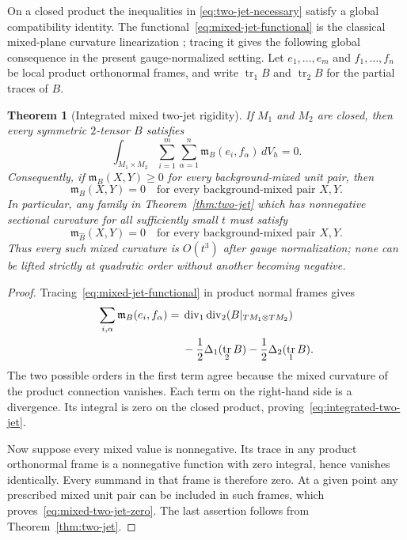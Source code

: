 \documentclass[11pt]{amsart}
\newtheorem{theorem}{Theorem}[section]
\theoremstyle{definition}
\theoremstyle{remark}
\DeclareMathOperator{\tr}{tr}
\begin{document}
On a closed product the inequalities in
\eqref{eq:two-jet-necessary} satisfy a global compatibility identity.
The functional~\eqref{eq:mixed-jet-functional} is the classical
mixed-plane curvature linearization
\cite{BourguignonDeschampsSentenac1973}; tracing it gives the following
global consequence in the present gauge-normalized setting.
Let $e_1,\ldots,e_m$ and $f_1,\ldots,f_n$ be local product
orthonormal frames, and write $\tr_1B$ and $\tr_2B$ for the partial
traces of $B$.

\begin{theorem}[Integrated mixed two-jet rigidity]
\label{thm:integrated-two-jet}
If $M_1$ and $M_2$ are closed, then every symmetric $2$-tensor $B$
satisfies
\begin{equation}\label{eq:integrated-two-jet}
 \int_{M_1\times M_2}
 \sum_{i=1}^m\sum_{\alpha=1}^n
 \mathfrak m_B(e_i,f_\alpha)\,dV_h=0.
\end{equation}
Consequently, if
$\mathfrak m_B(X,Y)\geq0$ for every background-mixed unit pair, then
\begin{equation}\label{eq:mixed-two-jet-zero}
 \mathfrak m_B(X,Y)=0
 \quad\text{for every background-mixed pair }X,Y.
\end{equation}
In particular, any family in Theorem~\ref{thm:two-jet} which has
nonnegative sectional curvature for all sufficiently small $t$ must
satisfy
\begin{equation}\label{eq:normalized-two-jet-zero}
 \mathfrak m_{\widehat B}(X,Y)=0
 \quad\text{for every background-mixed pair }X,Y.
\end{equation}
Thus every such mixed curvature is $O(t^3)$ after gauge
normalization; none can be lifted strictly at quadratic order without
another becoming negative.
\end{theorem}

\begin{proof}
Tracing~\eqref{eq:mixed-jet-functional} in product normal frames gives
\begin{align}
 \sum_{i,\alpha}\mathfrak m_B(e_i,f_\alpha)
 ={}&\operatorname{div}_1\operatorname{div}_2(B|_{TM_1\otimes TM_2})
 \notag\\
 &-\frac12\Delta_1(\tr_2B)
  -\frac12\Delta_2(\tr_1B).
 \label{eq:two-jet-divergence}
\end{align}
The two possible orders in the first term agree because the mixed
curvature of the product connection vanishes.  Each term on the
right-hand side is a divergence.  Its integral is zero on the closed
product, proving~\eqref{eq:integrated-two-jet}.

Now suppose every mixed value is nonnegative.  Its trace in any
product orthonormal frame is a nonnegative function with zero
integral, hence vanishes identically.  Every summand in that frame is
therefore zero.  At a given point any prescribed mixed unit pair can
be included in such frames, which proves~\eqref{eq:mixed-two-jet-zero}.
The last assertion follows from
Theorem~\ref{thm:two-jet}.
\end{proof}
\end{document}
